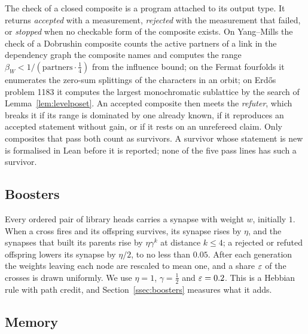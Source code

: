 The check of a closed composite is a program attached to its output type. It returns \emph{accepted} with a measurement, \emph{rejected} with the measurement that failed, or \emph{stopped} when no checkable form of the composite exists. On Yang--Mills the check of a Dobrushin composite counts the active partners of a link in the dependency graph the composite names and computes the range $\beta_{W}<1/(\text{partners}\cdot\frac14)$ from the influence bound; on the Fermat fourfolds it enumerates the zero-sum splittings of the characters in an orbit; on Erd\H{o}s problem 1183 it computes the largest monochromatic sublattice by the search of Lemma~\ref{lem:levelposet}. An accepted composite then meets the \emph{refuter}, which breaks it if its range is dominated by one already known, if it reproduces an accepted statement without gain, or if it rests on an unrefereed claim. Only composites that pass both count as survivors. A survivor whose statement is new is formalised in Lean before it is reported; none of the five pass lines has such a survivor.

\subsection{Boosters}

Every ordered pair of library heads carries a synapse with weight $w$, initially $1$. When a cross fires and its offspring survives, its synapse rises by $\eta$, and the synapses that built its parents rise by $\eta\gamma^{k}$ at distance $k\le4$; a rejected or refuted offspring lowers its synapse by $\eta/2$, to no less than $0.05$. After each generation the weights leaving each node are rescaled to mean one, and a share $\varepsilon$ of the crosses is drawn uniformly. We use $\eta=1$, $\gamma=\frac12$ and $\varepsilon=0.2$. This is a Hebbian rule with path credit, and Section~\ref{ssec:boosters} measures what it adds.

\subsection{Memory}

